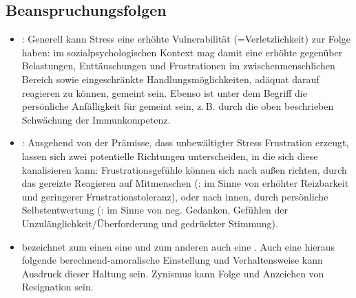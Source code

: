\subsection{Beanspruchungsfolgen}
\label{topic:beanspruchungsfolgen-psi}

\begin{itemize}
  \item {}:
Generell kann Stress eine erhöhte Vulnerabilität
(=Verletzlichkeit) zur Folge haben: im sozialpsychologischen
Kontext mag damit eine erhöhte  gegenüber Belastungen, Enttäuschungen und
Frustrationen im zwischenmenschlichen Bereich sowie
eingeschränkte Handlungsmöglichkeiten, adäquat darauf
reagieren zu können, gemeint sein. Ebenso ist unter dem
Begriff die persönliche Anfälligkeit für  gemeint sein, z.\,B. durch die oben
beschrieben Schwächung der Immunkompetenz.
\item 
{}:
Ausgehend von der Prämisse, dass unbewältigter Stress
Frustration erzeugt, lassen sich zwei potentielle Richtungen
unterscheiden, in die sich diese kanalisieren kann:
Frustrationsgefühle können sich nach außen richten, durch
das gereizte Reagieren auf Mitmenschen (: im
Sinne von erhöhter Reizbarkeit und geringerer
Frustrationstoleranz), oder nach innen, durch persönliche
Selbstentwertung (: im Sinne von neg.
Gedanken, Gefühlen der Unzulänglichkeit/Überforderung und
gedrückter Stimmung).

\item 
{} bezeichnet zum einen eine
 und
zum anderen auch eine . Auch eine hieraus
folgende berechnend-amoralische Einstellung und
Verhaltensweise kann Ausdruck dieser Haltung sein. Zynismus
kann Folge und Anzeichen von Resignation sein. 


\end{itemize}
